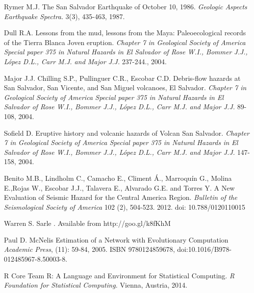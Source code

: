\documentclass[11pt,twoside]{rmta2010esp}%
\begin{document}
\begin{thebibliography}{99}
Rymer M.J. 
\newblock The San Salvador Earthquake of October 10, 1986.
\newblock \emph{Geologic Aspects Earthquake Spectra.}
 3(3), 435-463, 1987.


Dull R.A.
\newblock Lessons from the mud, lessons from the Maya: Paleoecological records of the Tierra Blanca Joven eruption.
\newblock \emph{Chapter 7 in Geological Society of America Special paper 375 in Natural Hazards in El Salvador of Rose W.I., Bommer J.J., L\'{o}pez D.L., Carr M.J. and Major J.J.}
 237-244., 2004.

Major J.J. Chilling S.P., Pullinguer C.R., Escobar C.D.
\newblock Debris-flow hazards at San Salvador, San Vicente, and San Miguel volcanoes, El Salvador.
\newblock \emph{Chapter 7 in Geological Society of America Special paper 375 in Natural Hazards in El Salvador of Rose W.I., Bommer J.J., L\'{o}pez D.L., Carr M.J. and Major J.J.}
 89-108, 2004.


Sofield D.
\newblock Eruptive history and volcanic hazards of Volcan San Salvador. 
\newblock \emph{Chapter 7 in Geological Society of America Special paper 375 in Natural Hazards in El Salvador of Rose W.I., Bommer J.J., L\'{o}pez D.L., Carr M.J. and Major J.J.}
 147-158, 2004.



Benito M.B., Lindholm C., Camacho E., Climent \'{A}., Marroqu\'{i}n G., Molina E.,Rojas W., Escobar J.J., Talavera E., Alvarado G.E. and Torres Y.
\newblock A New Evaluation of Seismic Hazard for the Central America Region. 
\newblock \emph{Bulletin of the Seismological Society of America}
 102 (2), 504-523. 2012.
\newblock  doi: 10.788/0120110015



Warren S. Sarle
. Available from http://goo.gl/k8fKhM



Paul D. McNelis
\newblock Estimation of a Network with Evolutionary Computation
\newblock \emph{Academic Press},
  (11): 59-84, 2005.
\newblock ISBN 9780124859678,
\newblock doi:10.1016/B978-012485967-8.50003-8.


R Core Team
\newblock R: A Language and Environment for Statistical Computing.
\newblock \emph{R Foundation for Statistical Computing.}
 Vienna, Austria, 2014.




\end{thebibliography}
\end{document}
